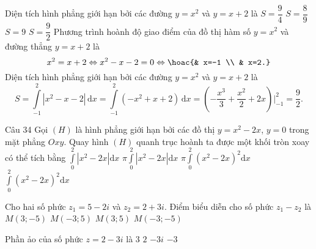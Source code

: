 \begin{ex}%
Diện tích hình phẳng giới hạn bởi các đường $y=x^2$ và $y=x+2$ là
\choice
{$S=\dfrac{9}{4}$}
{$S=\dfrac{8}{9}$}
{$S=9$}
{\True $S=\dfrac{9}{2}$}
\loigiai
{
Phương trình hoành độ giao điểm của đồ thị hàm số $y=x^2$ và đường thẳng $y=x+2$ là $$x^2=x+2\Leftrightarrow x^2-x-2=0\Leftrightarrow\hoac{& x=-1 \\ & x=2.}$$
Diện tích hình phẳng giới hạn bởi các đường $y=x^2$ và $y=x+2$ là $$S=\displaystyle\int\limits_{-1}^{2} \left|x^2-x-2\right| \mathrm{\,d}x=\int\limits_{-1}^{2} \left(-x^2+x+2\right) \mathrm{\,d}x=\left(-\dfrac{x^3}{3}+\dfrac{x^2}{2}+2x\right)\Bigg|^2_{-1}=\dfrac{9}{2}.$$
}
\end{ex}

\begin{ex}Câu 34%
Gọi $(H)$ là hình phẳng giới hạn bởi các đồ thị $y=x^2-2x$, $y=0$ trong mặt phẳng $Oxy$. Quay hình $(H)$ quanh trục hoành ta được một khối tròn xoay có thể tích bằng
\choice
{$\displaystyle\int\limits_0^2\left|x^2-2 x\right|\mathrm{d}x$}
{$\pi\displaystyle\int\limits_0^2\left|x^2-2x\right|\mathrm{d}x$}
{\True $\pi\displaystyle\int\limits_0^2\left(x^2-2x\right)^2\mathrm{d} x$}
{$\displaystyle\int\limits_0^2\left(x^2-2x\right)^2\mathrm{d}x$}
\end{ex}

\begin{ex}%
Cho hai số phức $z_1=5-2i$ và $z_2=2+3i$. Điểm biểu diễn cho số phức $z_1-z_2$ là
\choice
{\True $M\left( 3;-5 \right)$}
{ $M\left( -3;5 \right)$}
{ $M\left( 3;5 \right)$}
{ $M\left( -3;-5 \right)$}
\end{ex}

\begin{ex}%
Phần ảo của số phức $ z=2-3i $  là
\choice
{$ 3 $}
{$ 2 $}
{$ -3i $}
{\True $ -3 $}
\end{ex}

